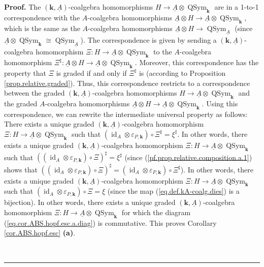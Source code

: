 \documentclass[numbers=enddot,12pt,final,onecolumn,notitlepage,abstracton]{scrartcl}%
\theoremstyle{definition}
\newenvironment{proof}[1][Proof]{\noindent\textbf{#1.} }{\ \rule{0.5em}{0.5em}}
\begin{document}
\begin{proof}
The $\left(  \mathbf{k},\underline{A}\right)  $-coalgebra homomorphisms
$H\rightarrow\underline{A}\otimes\operatorname*{QSym}\nolimits_{\mathbf{k}}$
are in a 1-to-1 correspondence with the $A$-coalgebra homomorphisms
$\underline{A}\otimes H\rightarrow\underline{A}\otimes\operatorname*{QSym}%
\nolimits_{\mathbf{k}}$, which is the same as the $A$-coalgebra homomorphisms
$\underline{A}\otimes H\rightarrow\operatorname*{QSym}\nolimits_{\underline{A}%
}$ (since $\underline{A}\otimes\operatorname*{QSym}\nolimits_{\mathbf{k}}%
\cong\operatorname*{QSym}\nolimits_{\underline{A}}$). The correspondence is
given by sending a $\left(  \mathbf{k},\underline{A}\right)  $-coalgebra
homomorphism $\Xi:H\rightarrow\underline{A}\otimes\operatorname*{QSym}%
\nolimits_{\mathbf{k}}$ to the $A$-coalgebra homomorphism $\Xi^{\sharp
}:\underline{A}\otimes H\rightarrow\underline{A}\otimes\operatorname*{QSym}%
\nolimits_{\mathbf{k}}$. Moreover, this correspondence has the property that
$\Xi$ is graded if and only if $\Xi^{\sharp}$ is (according to Proposition
\ref{prop.relative.graded}). Thus, this correspondence restricts to a
correspondence between the graded $\left(  \mathbf{k},\underline{A}\right)
$-coalgebra homomorphisms $H\rightarrow\underline{A}\otimes
\operatorname*{QSym}\nolimits_{\mathbf{k}}$ and the graded $A$-coalgebra
homomorphisms $\underline{A}\otimes H\rightarrow\underline{A}\otimes
\operatorname*{QSym}\nolimits_{\mathbf{k}}$. Using this correspondence, we can
rewrite the intermediate universal property as follows: There exists a unique
graded $\left(  \mathbf{k},\underline{A}\right)  $-coalgebra homomorphism
$\Xi:H\rightarrow\underline{A}\otimes\operatorname*{QSym}\nolimits_{\mathbf{k}%
}$ such that $\left(  \operatorname*{id}\nolimits_{A}\otimes\varepsilon
_{P,\mathbf{k}}\right)  \circ\Xi^{\sharp}=\xi^{\sharp}$. In other words, there
exists a unique graded $\left(  \mathbf{k},\underline{A}\right)  $-coalgebra
homomorphism $\Xi:H\rightarrow\underline{A}\otimes\operatorname*{QSym}%
\nolimits_{\mathbf{k}}$ such that $\left(  \left(  \operatorname*{id}%
\nolimits_{A}\otimes\varepsilon_{P,\mathbf{k}}\right)  \circ\Xi\right)
^{\sharp}=\xi^{\sharp}$ (since (\ref{pf.prop.relative.composition.a.1}) shows
that $\left(  \left(  \operatorname*{id}\nolimits_{A}\otimes\varepsilon
_{P,\mathbf{k}}\right)  \circ\Xi\right)  ^{\sharp}=\left(  \operatorname*{id}%
\nolimits_{A}\otimes\varepsilon_{P,\mathbf{k}}\right)  \circ\Xi^{\sharp}$). In
other words, there exists a unique graded $\left(  \mathbf{k},\underline{A}%
\right)  $-coalgebra homomorphism $\Xi:H\rightarrow\underline{A}%
\otimes\operatorname*{QSym}\nolimits_{\mathbf{k}}$ such that $\left(
\operatorname*{id}\nolimits_{A}\otimes\varepsilon_{P,\mathbf{k}}\right)
\circ\Xi=\xi$ (since the map (\ref{eq.def.kA-coalg.dies}) is a bijection). In
other words, there exists a unique graded $\left(  \mathbf{k},\underline{A}%
\right)  $-coalgebra homomorphism $\Xi:H\rightarrow\underline{A}%
\otimes\operatorname*{QSym}\nolimits_{\mathbf{k}}$ for which the diagram
(\ref{eq.cor.ABS.hopf.esc.a.diag}) is commutative. This proves Corollary
\ref{cor.ABS.hopf.esc} \textbf{(a)}.


\end{proof}
\end{document}
